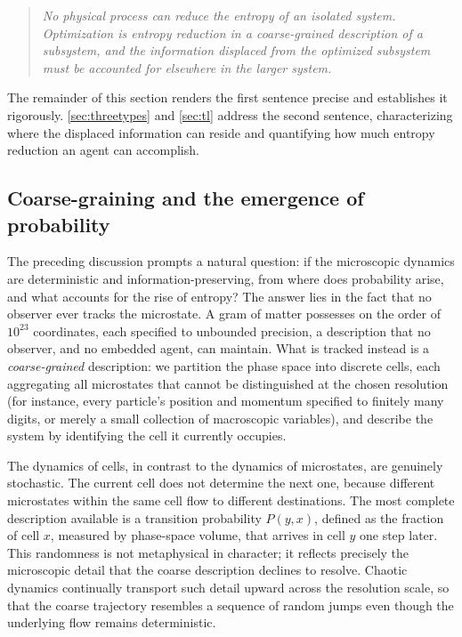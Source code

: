 \documentclass[11pt]{article}
\begin{document}
\begin{quote}
\emph{No physical process can reduce the entropy of an isolated system. Optimization is entropy reduction in a coarse-grained description of a subsystem, and the information displaced from the optimized subsystem must be accounted for elsewhere in the larger system.}
\end{quote}

The remainder of this section renders the first sentence precise and establishes it rigorously. \cref{sec:threetypes} and \cref{sec:tl} address the second sentence, characterizing where the displaced information can reside and quantifying how much entropy reduction an agent can accomplish.

\subsection{Coarse-graining and the emergence of probability}
\label{sec:coarse}

The preceding discussion prompts a natural question: if the microscopic dynamics are deterministic and information-preserving, from where does probability arise, and what accounts for the rise of entropy? The answer lies in the fact that no observer ever tracks the microstate. A gram of matter possesses on the order of $10^{23}$ coordinates, each specified to unbounded precision, a description that no observer, and no embedded agent, can maintain. What is tracked instead is a \emph{coarse-grained} description: we partition the phase space into discrete cells, each aggregating all microstates that cannot be distinguished at the chosen resolution (for instance, every particle's position and momentum specified to finitely many digits, or merely a small collection of macroscopic variables), and describe the system by identifying the cell it currently occupies.

The dynamics of cells, in contrast to the dynamics of microstates, are genuinely stochastic. The current cell does not determine the next one, because different microstates within the same cell flow to different destinations. The most complete description available is a transition probability $P(y, x)$, defined as the fraction of cell $x$, measured by phase-space volume, that arrives in cell $y$ one step later. This randomness is not metaphysical in character; it reflects precisely the microscopic detail that the coarse description declines to resolve. Chaotic dynamics continually transport such detail upward across the resolution scale, so that the coarse trajectory resembles a sequence of random jumps even though the underlying flow remains deterministic.
\end{document}
